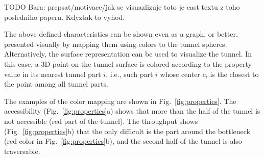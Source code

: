 \documentclass[usletter, 10pt, conference]{ieeeconf} %
\begin{document}
TODO Bara: prepsat/motivace/jak se visuazlizuje
toto je cast textu z toho posledniho paperu. Kdyztak to vyhod.

The above defined characteristics can be shown even as a graph, or better, presented visually by mapping them using colors to the tunnel spheres.
 Alternatively, the surface representation can be used to visualize the tunnel.
In this case, a 3D point on the tunnel surface is colored according to the property value in its nearest tunnel part $i$,  i.e., such part $i$ whose center $c_i$ is the closest to the point among all tunnel parts.

The examples of the color mapping are shown in Fig.~\ref{fig:properties}.
The accessibility (Fig.~\ref{fig:properties}a) shows that more than the half of the tunnel is not accessible (red part of the tunnel).
The throughput shows (Fig.~\ref{fig:properties}b) that the only difficult is the part around the bottleneck (red color in Fig.~\ref{fig:properties}b), and the second half of the tunnel is also traversable.
\end{document}

